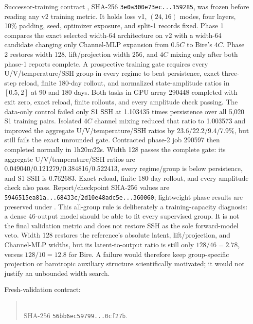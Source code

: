 \documentclass[11pt]{article}
\begin{document}
Successor-training contract\newline
{}, SHA-256
\texttt{3e0a300e73ec...159285}, was frozen before reading any v2 training metric.
It holds loss v1, \((24,16)\) modes, four layers, 10\% padding, seed, optimizer
exposure, and split-1 records fixed.  Phase 1 compares the exact selected width-64
architecture on v2 with a width-64 candidate changing only Channel-MLP expansion from
\(0.5C\) to Bire's \(4C\).  Phase 2 restores width 128, lift/projection width 256, and
\(4C\) mixing only after both phase-1 reports complete.  A prospective training gate
requires every U/V/temperature/SSH group in every regime to beat persistence, exact
three-step reload, finite 180-day rollout, and normalized state-amplitude ratios in
\([0.5,2]\) at 90 and 180 days.  Both tasks in GPU array 290448 completed with exit
zero, exact reload, finite rollouts, and every amplitude check passing.  The data-only
control failed only S1 SSH at 1.103435 times persistence over all 5,020 S1 training
pairs.  Isolated \(4C\) channel mixing reduced that ratio to 1.003573 and improved the
aggregate U/V/temperature/SSH ratios by 23.6/22.2/9.4/7.9\%, but still fails the exact
unrounded gate.  Contracted phase-2 job 290597 then completed normally in 1h20m22s.
Width 128 passes the complete gate: its aggregate U/V/temperature/SSH ratios are
0.049040/0.121279/0.384816/0.522413, every regime/group is below persistence, and
S1 SSH is 0.762683.  Exact reload, finite 180-day rollout, and every amplitude check
also pass.  Report/checkpoint SHA-256 values are
\texttt{5946515ea81a...68433c}/\texttt{2d10e48adc5e...360060}; lightweight phase
results are preserved under .
This all-group rule is deliberately a training-capacity diagnosis: a dense 46-output
model should be able to fit every supervised group.  It is not the final validation
metric and does not restore SSH as the sole forward-model veto.
Width 128 restores the reference's absolute latent, lift/projection, and Channel-MLP
widths, but its latent-to-output ratio is still only \(128/46=2.78\), versus
\(128/10=12.8\) for Bire.  A failure would therefore keep group-specific projection or
barotropic auxiliary structure scientifically motivated; it would not justify an
unbounded width search.

Fresh-validation contract:
\begin{quote}
\\
SHA-256 \texttt{56bb6ec59799...0cf27b}.
\end{quote}
\end{document}
